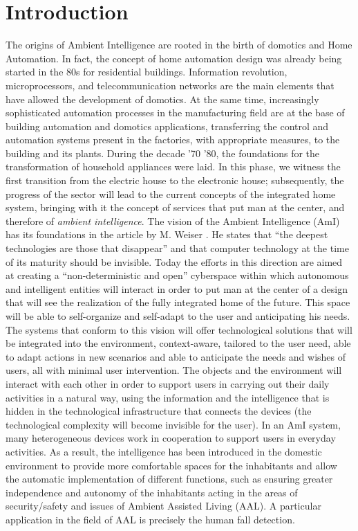 \chapter{Introduction}\label{ch:intro}

The origins of Ambient Intelligence are rooted in the birth of domotics and Home Automation. In fact, the concept of home automation design was already being started in the 80s for residential buildings. Information revolution, microprocessors, and telecommunication networks are the main elements that have allowed the development of domotics. At the same time, increasingly sophisticated automation processes in the manufacturing field are at the base of building automation and domotics applications, transferring the control and automation systems present in the factories, with appropriate measures, to the building and its plants. During the decade '70 '80, the foundations for the transformation of household appliances were laid. In this phase, we witness the first transition from the electric house to the electronic house; subsequently, the progress of the sector will lead to the current concepts of the integrated home system, bringing with it the concept of services that put man at the center, and therefore of \textit{ambient intelligence}. The vision of the Ambient Intelligence (AmI) \cite{ducatel2001scenarios} has its foundations in the article by M. Weiser \cite{weiser1991}. He states that ``the deepest technologies are those that disappear'' and that computer technology at the time of its maturity should be invisible.
Today the efforts in this direction are aimed at creating a ``non-deterministic and open'' cyberspace within which autonomous and intelligent entities will interact in order to put man at the center of a design that will see the realization of the fully integrated home of the future. This space will be able to self-organize and self-adapt to the user and anticipating his needs. The systems that conform to this vision will offer technological solutions that will be integrated into the environment, context-aware, tailored to the user need, able to adapt actions in new scenarios and able to anticipate the needs and wishes of users, all with minimal user intervention. 
The objects and the environment will interact with each other in order to support users in carrying out their daily activities in a natural way, using the information and the intelligence that is hidden in the technological infrastructure that connects the devices (the technological complexity will become invisible for the user).
In an AmI system, many heterogeneous devices work in cooperation to support users in everyday activities. As a result, the intelligence has been introduced in the domestic environment to provide more comfortable spaces for the inhabitants and allow the automatic implementation of different functions, such as ensuring greater independence and autonomy of the inhabitants acting in the areas of security/safety and issues of Ambient Assisted Living (AAL). A particular application in the field of AAL is precisely the human fall detection. 

